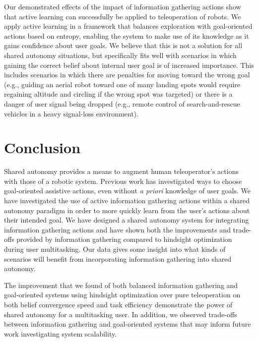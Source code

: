 \documentclass[conference]{IEEEtran}
\begin{document}
Our demonstrated effects of the impact of information gathering actions show that active learning can successfully be applied to teleoperation of robots. We apply active learning in a framework that balances exploration with goal-oriented actions based on entropy, enabling the system to make use of its knowledge as it gains confidence about user goals. We believe that this is not a solution for all shared autonomy situations, but specifically fits well with scenarios in which gaining the correct belief about internal user goal is of increased importance. This includes scenarios in which there are penalties for moving toward the wrong goal (e.g., guiding an aerial robot toward one of many landing spots would require regaining altitude and circling if the wrong spot was targeted) or there is a danger of user signal being dropped (e.g., remote control of search-and-rescue vehicles in a heavy signal-loss environment).

\section{Conclusion}

Shared autonomy provides a means to augment human teleoperator's actions with those of a robotic system. Previous work has investigated ways to choose goal-oriented assistive actions, even without \textit{a priori} knowledge of user goals. We have investigated the use of active information gathering actions within a shared autonomy paradigm in order to more quickly learn from the user's actions about their intended goal. We have designed a shared autonomy system for integrating information gathering actions and have shown both the improvements and trade-offs provided by information gathering compared to hindsight optimization during user multitasking. Our data gives some insight into what kinds of scenarios will benefit from incorporating information gathering into shared autonomy.

The improvement that we found of both balanced information gathering and goal-oriented systems using hindsight optimization over pure teleoperation on both belief convergence speed and task efficiency demonstrate the power of shared autonomy for a multitasking user. In addition, we observed trade-offs between information gathering and goal-oriented systems that may inform future work investigating system scalability.



\end{document}
